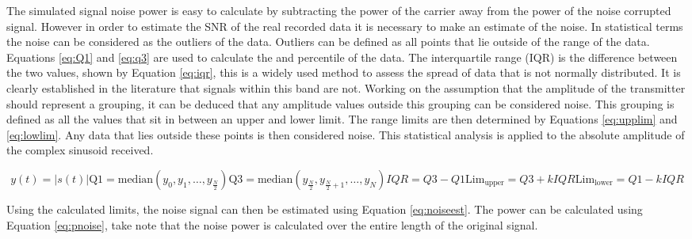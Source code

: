 The simulated signal noise power is easy to calculate by subtracting the power of the carrier away from the power of the noise corrupted signal. However in order to estimate the SNR of the real recorded data it is necessary to make an estimate of the noise. In statistical terms the noise can be considered as the outliers of the data. Outliers can be defined as all points that lie outside of the range of the data. Equations \ref{eq:Q1} and \ref{eq:q3} are used to calculate the  and  percentile of the data. The interquartile range (IQR) is the difference between the two values, shown by Equation \ref{eq:iqr}, this is a widely used method to assess the spread of data that is not normally distributed. It is clearly established in the literature that signals within this band are not. Working on the assumption that the amplitude of the transmitter should represent a grouping, it can be deduced that any amplitude values outside this grouping can be considered noise. This grouping is defined as all the values that sit in between an upper and lower limit. The range limits are then determined by Equations \ref{eq:upplim} and \ref{eq:lowlim}. Any data that lies outside these points is then considered noise. This statistical analysis is applied to the absolute amplitude of the complex sinusoid received.

\begin{multicols}{2}

\begin{subequations}
    \begin{equation}
        y(t) = |s(t)|
    \end{equation}
    \begin{equation}
        \text{Q1} = \text{median}\left(y_{0},y_{1},\dots,y_{\frac{N}{2}}\right)
        \label{eq:Q1}
    \end{equation}
    \begin{equation}
        \text{Q3} = \text{median}\left(y_{\frac{N}{2}},y_{\frac{N}{2}+1},\dots,y_{N}\right)
        \label{eq:q3}
    \end{equation}
    \begin{equation}
        IQR = Q3 - Q1
        \label{eq:iqr}
    \end{equation}
    \begin{equation}
        \text{Lim}_{\text{upper}} = Q3 + k IQR
        \label{eq:upplim}
    \end{equation}
    \begin{equation}
        \text{Lim}_{\text{lower}} = Q1 - k IQR
        \label{eq:lowlim}
    \end{equation}
\end{subequations}
\end{multicols}
Using the calculated limits, the noise signal can then be estimated using Equation \ref{eq:noiseest}. The power can be calculated using Equation \ref{eq:pnoise}, take note that the noise power is calculated over the entire length of the original signal. 

